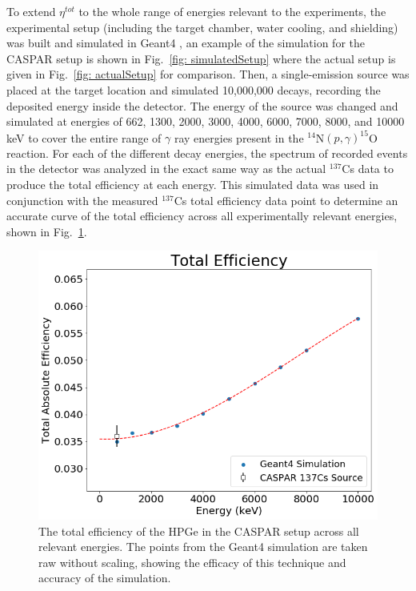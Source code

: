 To extend $\eta^{tot}$ to the whole range of energies relevant to the experiments, the experimental setup (including the target chamber, water cooling, and shielding) was built and simulated in Geant4 \cite{Agostinelli2003}, an example of the simulation for the CASPAR setup is shown in Fig.\ \ref{fig: simulatedSetup} where the actual setup is given in Fig.\ \ref{fig: actualSetup} for comparison. Then, a single-emission source was placed at the target location and simulated 10,000,000 decays, recording the deposited energy inside the detector. The energy of the source was changed and simulated at energies of 662, 1300, 2000, 3000, 4000, 6000, 7000, 8000, and 10000 keV to cover the entire range of $\gamma$ ray energies present in the $^{14}$N$\left( p,\gamma \right) ^{15}$O reaction. For each of the different decay energies, the spectrum of recorded events in the detector was analyzed in the exact same way as the actual $^{137}$Cs data to produce the total efficiency at each energy. This simulated data was used in conjunction with the measured $^{137}$Cs total efficiency data point to determine an accurate curve of the total efficiency across all experimentally relevant energies, shown in Fig.\ \ref{fig: totalEfficiency}.

\begin{figure}
\centering
\includegraphics[width=\linewidth]{figures/totalEfficiency.png}
\caption{The total efficiency of the HPGe in the CASPAR setup across all relevant energies. The points from the Geant4 simulation are taken raw without scaling, showing the efficacy of this technique and accuracy of the simulation.  }
\label{fig: totalEfficiency}
\end{figure}



